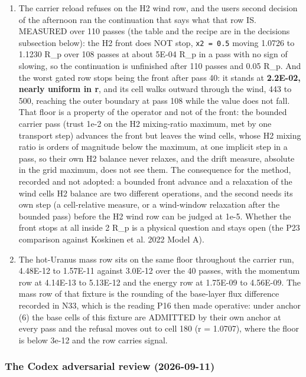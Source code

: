 \documentclass[english,a4paper]{my_memo}
\begin{document}
\begin{enumerate}
\item
  The carrier reload refuses on the H2 wind row, and the user\textquotesingle s second
  decision of the afternoon ran the continuation that says what that row IS.
  MEASURED over 110 passes (the table and the recipe are in the decisions
  subsection below): the H2 front does NOT stop, \texttt{x2\ =\ 0.5} moving 1.0726 to
  1.1230 R\_p over 108 passes at about 5E-04 R\_p in a pass with no sign of
  slowing, so the continuation is unfinished after 110 passes and 0.05 R\_p.
  And the worst gated row stops being the front after pass 40: it stands at
  \textbf{2.2E-02, nearly uniform in r}, and its cell walks outward through the
  wind, 443 to 500, reaching the outer boundary at pass 108 while the value
  does not fall. That floor is a property of the operator and not of the
  front: the bounded carrier pass (trust 1e-2 on the H2 mixing-ratio maximum,
  met by one transport step) advances the front but leaves the wind cells,
  whose H2 mixing ratio is orders of magnitude below the maximum, at one
  implicit step in a pass, so their own H2 balance never relaxes, and the
  drift measure, absolute in the grid maximum, does not see them. The
  consequence for the method, recorded and not adopted: a bounded front
  advance and a relaxation of the wind cells\textquotesingle{} H2 balance are two different
  operations, and the second needs its own step (a cell-relative measure, or
  a wind-window relaxation after the bounded pass) before the H2 wind row can
  be judged at 1e-5. Whether the front stops at all inside 2 R\_p is a
  physical question and stays open (the P23 comparison against Koskinen et
  al. 2022 Model A).
\item
  The hot-Uranus mass row sits on the same floor throughout the carrier
  run, 4.48E-12 to 1.57E-11 against 3.0E-12 over the 40 passes, with the
  momentum row at 4.14E-13 to 5.13E-12 and the energy row at 1.75E-09 to
  4.56E-09. The mass row of that fixture is the rounding of the base-layer
  flux difference recorded in N33, which is the reading P16 then made
  operative: under anchor (6) the base cells of this fixture are ADMITTED by
  their own anchor at every pass and the refusal moves out to cell 180
  (r = 1.0707), where the floor is below 3e-12 and the row carries signal.
\end{enumerate}

\subsubsection{The Codex adversarial review (2026-09-11)}\label{the-codex-adversarial-review-2026-09-11}
\end{document}
